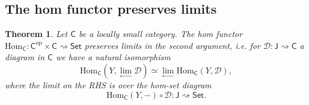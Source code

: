 \documentclass[a4paper,10pt]{scrreprt}
\newcommand{\Hom}{\mathrm{Hom}}
\theoremstyle{definition}
\theoremstyle{plain}
\newtheorem{theorem}{Theorem}[section]
\theoremstyle{remark}
\begin{document}
\subsection{The hom functor preserves limits}
\begin{theorem}
  \label{thm:homfunctorpreserveslimits}
  Let $\mathsf{C}$ be a locally small category. The hom functor $\Hom_{\mathsf{C}}\colon \mathsf{C}^{\mathrm{op}} \times \mathsf{C} \rightsquigarrow \mathsf{Set}$ preserves limits in the second argument, i.e. for $\mathcal{D}\colon \mathsf{J} \rightsquigarrow \mathsf{C}$ a diagram in $\mathsf{C}$ we have a natural isomorphism
  \begin{equation*}
    \Hom_{\mathsf{C}}(Y, \lim_{\leftarrow}\mathcal{D}) \simeq \lim_{\leftarrow}\Hom_{\mathsf{C}}(Y, \mathcal{D}),
  \end{equation*}
  where the limit on the RHS is over the hom-set diagram
  \begin{equation*}
    \Hom_{\mathsf{C}}(Y, -) \circ \mathcal{D} \colon \mathsf{J} \rightsquigarrow \mathsf{Set}.
  \end{equation*}
\end{theorem}
\end{document}
